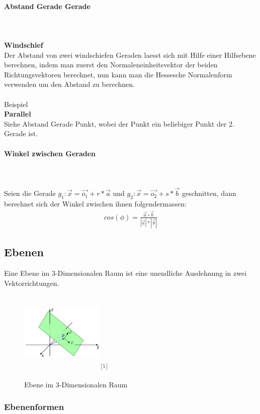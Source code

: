 \documentclass[a4paper]{article} %
\begin{document}
	\paragraph{Abstand Gerade Gerade}
	\hspace{0 cm} \\ \noindent \\
	\textbf{Windschief\\}
	Der Abstand von zwei windschiefen Geraden laesst sich mit Hilfe einer Hilfsebene berechnen, indem man zuerst den Normaleneinheitsvektor der beiden Richtungsvektoren berechnet, nun kann man die Hessesche Normalenform verwenden um den Abstand zu berechnen.\\\\
	Beispiel\\
	\textbf{Parallel\\}
	Siehe Abstand Gerade Punkt, wobei der Punkt ein beliebiger Punkt der 2. Gerade ist.
	\paragraph{Winkel zwischen Geraden}
	\hspace{0 cm} \\ \noindent \\
	Seien die Gerade $g_1: \vec{x}= \vec{o_1}+r*\vec{a}$ und $ g_2: \vec{x}=\vec{o_2}+s*\vec{b} $  geschnitten, dann berechnet sich der Winkel zwischen ihnen folgendermassen: 
	\begin{align*}
		cos(\phi)= \frac{\vec{a} \circ \vec{b}}{|\vec{a}|*|\vec{b}|}
	\end{align*}
	\subsection{Ebenen}
	Eine Ebene im 3-Dimensionalen Raum ist eine unendliche Ausdehnung in zwei Vektorrichtungen.
	\begin{figure}[H]
				\includegraphics[width=150px, height=150px]{Ebene.png}$^{[5]}$
					\captionsetup{labelformat=empty}
				\caption{Ebene im 3-Dimensionalen Raum}
	\end{figure}
	\subsubsection{Ebenenformen}
\end{document}
